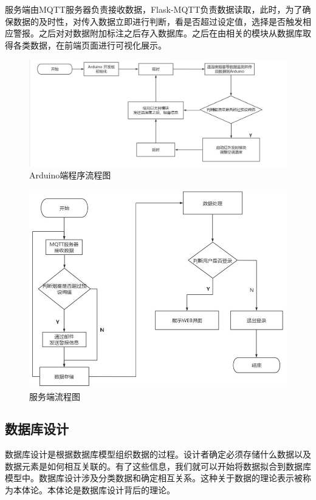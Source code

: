 服务端由MQTT服务器负责接收数据，Flask-MQTT负责数据读取，此时，为了确保数据的及时性，对传入数据立即进行判断，看是否超过设定值，选择是否触发相应警报。之后对对数据附加标注之后存入数据库。之后在由相关的模块从数据库取得各类数据，在前端页面进行可视化展示。

\begin{figure}[htbp]
	\centering
	\includegraphics[width=0.85\linewidth]{figure/2-5}
	\caption{Arduino端程序流程图}
	\label{fig:2-5}
\end{figure}

\begin{figure}[htbp]
	\centering
	\includegraphics[width=0.85\linewidth]{figure/2-6}
	\caption{服务端流程图}
	\label{fig:2-6}
\end{figure}



\subsection{数据库设计}

数据库设计是根据数据库模型组织数据的过程。设计者确定必须存储什么数据以及数据元素是如何相互关联的。有了这些信息，我们就可以开始将数据拟合到数据库模型中。数据库设计涉及分类数据和确定相互关系。这种关于数据的理论表示被称为本体论。本体论是数据库设计背后的理论。

